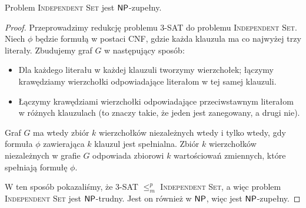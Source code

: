 \begin{theorem}
    Problem \textsc{Independent Set} jest $\textsf{NP}$-zupełny.
\end{theorem}
\begin{proof}
    Przeprowadzimy redukcję problemu 3-SAT do problemu \textsc{Independent Set}. Niech $\phi$ będzie formułą w postaci CNF, gdzie każda klauzula ma co najwyżej trzy literały. Zbudujemy graf $G$ w następujący sposób:
    \begin{itemize}
        \item Dla każdego literału w każdej klauzuli tworzymy wierzchołek; łączymy krawędziamy wierzchołki odpowiadające literałom w tej samej klauzuli.
        \item Łączymy krawędziami wierzchołki odpowiadające przeciwstawnym literałom w różnych klauzulach (to znaczy takie, że jeden jest zanegowany, a drugi nie).
    \end{itemize}
    Graf $G$ ma wtedy zbiór $k$ wierzchołków niezależnych wtedy i tylko wtedy, gdy formuła $\phi$ zawierająca $k$ klauzul jest spełnialna. Zbiór $k$ wierzchołków niezależnych w grafie $G$ odpowiada zbiorowi $k$ wartościowań zmiennych, które spełniają formułę $\phi$.

    W ten sposób pokazaliśmy, że 3-SAT $\leq_m^p$ \textsc{Independent Set}, a więc problem \textsc{Independent Set} jest $\textsf{NP}$-trudny. Jest on również w $\textsf{NP}$, więc jest $\textsf{NP}$-zupełny.
\end{proof}

